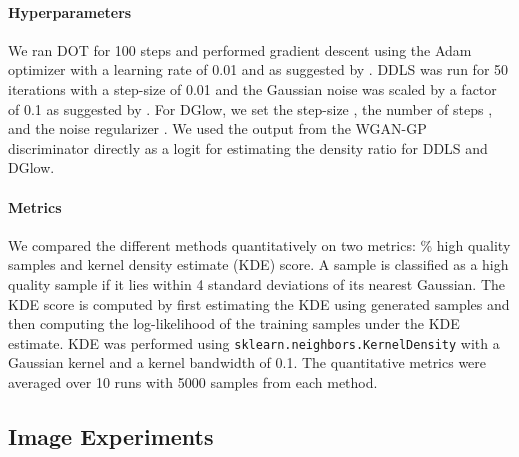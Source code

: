 \documentclass{article} \usepackage{iclr2021_conference,times}
\newcommand{\ourmethod}{\textsc{DG}low}
\begin{document}
\paragraph{Hyperparameters} We ran DOT for 100 steps and performed gradient descent using the Adam optimizer with a learning rate of 0.01 and  as suggested by \citet{tanaka2019discriminator}. DDLS was run for 50 iterations with a step-size of 0.01 and the Gaussian noise was scaled by a factor of 0.1 as suggested by \citet{che2020your}. For \ourmethod{}, we set the step-size , the number of steps , and the noise regularizer . We used the output from the WGAN-GP discriminator directly as a logit for estimating the density ratio for DDLS and \ourmethod{}.

\paragraph{Metrics} We compared the different methods quantitatively on two metrics: \% high quality samples and kernel density estimate (KDE) score. A sample is classified as a high quality sample if it lies within 4 standard deviations of its nearest Gaussian. The KDE score is computed by first estimating the KDE using generated samples and then computing the log-likelihood of the training samples under the KDE estimate. KDE was performed using \texttt{sklearn.neighbors.KernelDensity} with a Gaussian kernel and a kernel bandwidth of 0.1. The quantitative metrics were averaged over 10 runs with 5000 samples from each method.

\subsection{Image Experiments}
\end{document}
